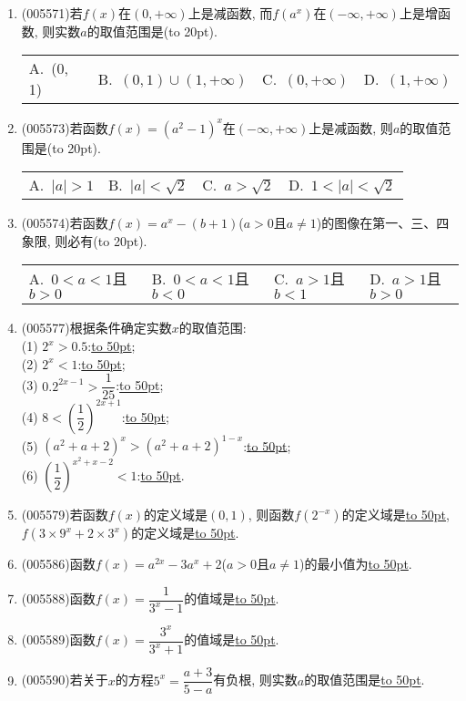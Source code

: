 \documentclass[10pt,a4paper]{article}
\newcommand{\blank}[1]{\underline{\hbox to #1pt{}}}
\newcommand{\bracket}[1]{(\hbox to #1pt{})}
\newcommand{\fourch}[4]{\par\begin{tabular}{p{.23\textwidth}p{.23\textwidth}p{.23\textwidth}p{.23\textwidth}}
A.~#1 &B.~#2& C.~#3& D.~#4
\end{tabular}}
\begin{document}
\begin{enumerate}[1.]
{}{}
\item {\tiny (005571)}若$f(x)$在$(0,+\infty)$上是减函数, 而$f(a^x)$在$(-\infty ,+\infty)$上是增函数, 则实数$a$的取值范围是\bracket{20}.
\fourch{(0, 1)}{$(0,1)\cup (1,+\infty)$}{$(0,+\infty)$}{$(1,+\infty)$}
\item {\tiny (005573)}若函数$f(x)=(a^2-1)^x$在$(-\infty ,+\infty)$上是减函数, 则$a$的取值范围是\bracket{20}.
\fourch{$|a|>1$}{$|a|<\sqrt 2$}{$a>\sqrt 2$}{$1<|a|<\sqrt 2$}
\item {\tiny (005574)}若函数$f(x)=a^x-(b+1)$($a>0$且$a\ne 1$)的图像在第一、三、四象限, 则必有\bracket{20}.
\fourch{$0<a<1$且$b>0$}{$0<a<1$且$b<0$}{$a>1$且$b<1$}{$a>1$且$b>0$}
\item {\tiny (005577)}根据条件确定实数$x$的取值范围:\\
(1) $2^x>0.5$:\blank{50};\\
(2) $2^x<1$:\blank{50};\\
(3) $0.2^{2x-1}>\dfrac 1{25}$:\blank{50};\\
(4) $8<(\dfrac 12)^{2x+1}$:\blank{50};\\
(5) $(a^2+a+2)^x>(a^2+a+2)^{1-x}$:\blank{50};\\
(6) $(\dfrac 12)^{x^2+x-2}<1$:\blank{50}.
\item {\tiny (005579)}若函数$f(x)$的定义域是$(0, 1)$, 则函数$f(2^{-x})$的定义域是\blank{50}, $f(3\times 9^x+2\times 3^x)$的定义域是\blank{50}.
\item {\tiny (005586)}函数$f(x)=a^{2x}-3a^x+2$($a>0$且$a\ne 1$)的最小值为\blank{50}.
\item {\tiny (005588)}函数$f(x)=\dfrac 1{3^x-1}$的值域是\blank{50}.
\item {\tiny (005589)}函数$f(x)=\dfrac{3^x}{3^x+1}$的值域是\blank{50}.
\item {\tiny (005590)}若关于$x$的方程$5^x=\dfrac{a+3}{5-a}$有负根, 则实数$a$的取值范围是\blank{50}.

\end{enumerate}
\end{document}
